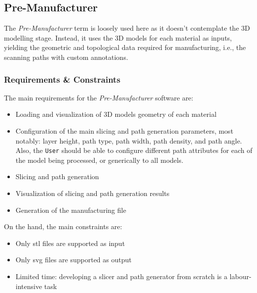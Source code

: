 
\subsection{Pre-Manufacturer}%
\label{sec:pre-manufacturer}
%
The \emph{Pre-Manufacturer} term is loosely used here as it doesn't contemplate
the 3D modelling stage. Instead, it uses the 3D models for each
material as inputs, yielding the geometric and topological data required for
manufacturing, i.e., the scanning paths with custom annotations.

\subsubsection{Requirements \& Constraints}%
\label{sec:requ--constr-premanuf}
The main requirements for the \emph{Pre-Manufacturer} software are:
\begin{itemize}
\item Loading and visualization of 3D models geometry of each material
\item Configuration of the main slicing and path generation parameters, most
  notably: layer height, path type, path width, path density, and path
  angle. Also, the \texttt{User} should be able to configure
different path attributes for each of the model being processed, or generically
to all models.
\item Slicing and path generation
\item Visualization of slicing and path generation results
\item Generation of the manufacturing file
\end{itemize}

On the hand, the main constraints are:
\begin{itemize}
\item Only \gls{stl} files are supported as input
\item Only \gls{svg} files are supported as output
\item Limited time: developing a slicer and path generator from scratch is a
  labour-intensive task 
\end{itemize}

